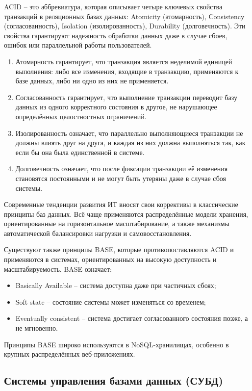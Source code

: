 ACID -- это аббревиатура, которая описывает четыре ключевых свойства транзакций в реляционных базах данных: Atomicity (атомарность), Consistency (согласованность), Isolation (изолированность), Durability (долговечность). Эти свойства гарантируют надежность обработки данных даже в случае сбоев, ошибок или параллельной работы пользователей.
\begin{enumerate}
	\item Атомарность гарантирует, что транзакция является неделимой единицей выполнения: либо все изменения, входящие в транзакцию, применяются к базе данных, либо ни одно из них не применяется.
	\item Согласованность гарантирует, что выполнение транзакции переводит базу данных из одного корректного состояния в другое, не нарушающее определённых целостностных ограничений.
	\item Изолированность означает, что параллельно выполняющиеся транзакции не должны влиять друг на друга, и каждая из них должна выполняться так, как если бы она была единственной в системе.
	\item Долговечность означает, что после фиксации транзакции её изменения становятся постоянными и не могут быть утеряны даже в случае сбоя системы.
\end{enumerate}

Современные тенденции развития ИТ вносят свои коррективы в классические принципы баз данных. Всё чаще применяются распределённые модели хранения, ориентированные на горизонтальное масштабирование, а также механизмы автоматической балансировки нагрузки и самовосстановления.

Существуют также принципы BASE, которые противопоставляются ACID и применяются в системах, ориентированных на высокую доступность и масштабируемость. BASE означает:
\begin{itemize}
	\item Basically Available -- система доступна даже при частичных сбоях;
	\item Soft state -- состояние системы может изменяться со временем;
	\item Eventually consistent -- система достигает согласованного состояния позже, а не мгновенно.
 \end{itemize}
 
Принципы BASE широко используются в NoSQL-хранилищах, особенно в крупных распределённых веб-приложениях.
 
\subsection{Системы управления базами данных (СУБД)}

